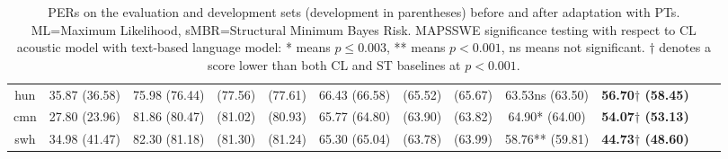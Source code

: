\begin{table*}[t]
{\begin{tabular}{| c || c | c c c | c c c | c | c c c |}
    \\
    hun & 35.87 (36.58)
    & 75.98 (76.44) & (77.56) & (77.61)
    & 66.43 (66.58) & (65.52) & (65.67)
    & 63.53ns (63.50)
    &   \textbf{56.70$\dagger$ (58.45)} &&
    \\
    cmn & 27.80 (23.96)
    & 81.86 (80.47) & (81.02) & (80.93)
    & 65.77 (64.80) & (63.90) & (63.82)
    & 64.90* (64.00)
    &   \textbf{54.07$\dagger$ (53.13)} &&
    \\
    swh & 34.98 (41.47)
    & 82.30 (81.18) & (81.30) & (81.24)
    & 65.30 (65.04) & (63.78) & (63.99)
    & 58.76** (59.81)
    &   \textbf{44.73$\dagger$ (48.60)} &&
    \\\hline
\end{tabular}}
\vspace*{1mm}
\caption{\label{tab:ptresult} PERs on the evaluation and development sets (development in parentheses) before and after adaptation with PTs.  ML=Maximum Likelihood, sMBR=Structural Minimum Bayes Risk.  MAPSSWE significance testing with respect to CL acoustic model with text-based language model: * means $p\le 0.003$, ** means $p<0.001$, ns means not significant. $\dagger$ denotes a score lower than both CL and ST baselines at $p<0.001$.}
\end{table*}


